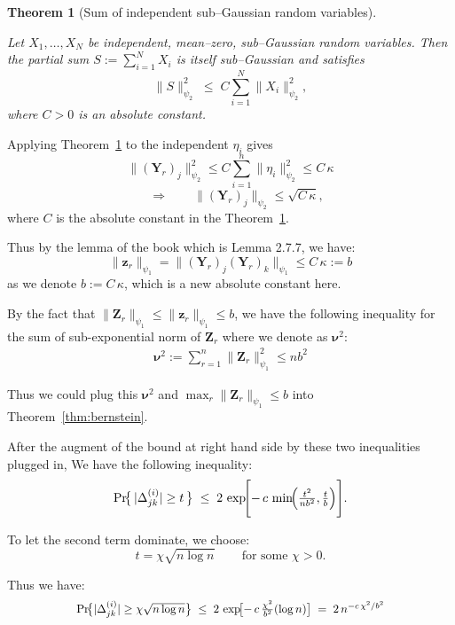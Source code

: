 \documentclass{beamer}
\newtheorem{thm}{Theorem}
\theoremstyle{remark}
\begin{document}
\begin{frame}
\begin{thm}[Sum of independent sub–Gaussian random variables]
  \label{thm:sug}

  Let \(X_{1},\dots ,X_{N}\) be independent, mean–zero, sub–Gaussian
  random variables.  Then the partial sum
  \(S:=\sum_{i=1}^{N}X_{i}\) is itself sub–Gaussian and satisfies
  \[
    \bigl\|S\bigr\|_{\psi_{2}}^{2}
       \;\le\;
       C\sum_{i=1}^{N}\bigl\|X_{i}\bigr\|_{\psi_{2}}^{2},
  \]
  where \(C>0\) is an absolute constant.
  \end{thm}


  Applying Theorem~\ref{thm:sug} to the independent \(\eta_{i}\) gives
  \[
    \|(\mathbf{Y}_{r})_{j}\|_{\psi_{2}}^{2}
       \le C \sum_{i=1}^{n}\|\eta_{i}\|_{\psi_{2}}^{2}
       \le C\,\kappa
  \]
  \[
    \quad\Longrightarrow\qquad
    \|(\mathbf{Y}_{r})_{j}\|_{\psi_{2}}\le\sqrt{C\,\kappa},
  \]
  where \(C\) is the absolute constant in the Theorem~\ref{thm:sug}.

Thus by the lemma of the book\cite{vershynin2018high} which is Lemma 2.7.7, we have:
\[
  \|\mathbf{z}_{r}\|_{\psi_{1}} = \|(\mathbf{Y}_{r})_{j}(\mathbf{Y}_{r})_{k}\|_{\psi_{1}} \leq C\,\kappa := b
\]
as we denote \( b := C\,\kappa \), which is a new absolute constant here.
\end{frame}
\begin{frame}
By the fact that $\|\mathbf{Z}_{r}\|_{\psi_{1}} \leq \|\mathbf{z}_{r}\|_{\psi_{1}} \leq b$, we have
the following inequality for the sum of sub-exponential norm of \(\mathbf{Z}_{r}\) where we denote as \(\boldsymbol{\nu}^{2}\):
\begin{align*}
    \boldsymbol{\nu}^{2} := \sum_{r=1}^{n}\|\mathbf{Z}_{r}\|_{\psi_{1}}^{2}
    \leq n b^{2}
\end{align*}

Thus we could plug this $\boldsymbol\nu^{2}$ and $\max_{r}\|\mathbf{Z}_{r}\|_{\psi_{1}} \le b$ into Theorem~\ref{thm:bernstein}.

After the augment of the bound at right hand side by these two inequalities plugged in, We have the following inequality:
    \[
\Pr\!\bigl\{\,|\Delta_{jk}^{(i)}|\ge t\,\bigr\}
     \;\le\;
     2\,\exp\!\Biggl[
         -\,c\,
         \min\!\Bigl(
             \tfrac{t^{2}}{n b^{2}},
             \tfrac{t}{b}
         \Bigr)
     \Biggr].
\]

To let the second term dominate, we choose:
\[
    t = \chi\sqrt{n \log n}\, \qquad\text{for some }\chi>0.
\]

Thus we have:
\[
\scalebox{0.93}{$
\Pr\!\bigl\{|\Delta_{jk}^{(i)}|\ge \chi\sqrt{n \log n}\bigr\}
\;\le\;
2\,\exp\!\bigl[-\,c\,\tfrac{\chi^2}{b^2}(\log n)\bigr]
\;=\;
2\,n^{-c\,\chi^2/b^2}
$}
\]
\end{frame}
\end{document}
